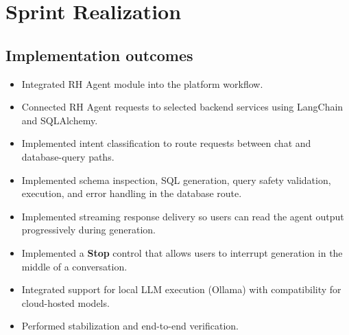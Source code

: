                                                                                                 \Needspace{0.28\textheight}
                                                                                                \section{Sprint Realization}
                                                                                                \subsection{Implementation outcomes}
                                                                                                \begin{itemize}[noitemsep]
                                                                                                    \item Integrated RH Agent module into the platform workflow.
                                                                                                        \item Connected RH Agent requests to selected backend services using LangChain and SQLAlchemy.
                                                                                                            \item Implemented intent classification to route requests between chat and database-query paths.
                                                                                                                \item Implemented schema inspection, SQL generation, query safety validation, execution, and error handling in the database route.
                                                                                                                    \item Implemented streaming response delivery so users can read the agent output progressively during generation.
                                                                                                                        \item Implemented a \textbf{Stop} control that allows users to interrupt generation in the middle of a conversation.
                                                                                                                            \item Integrated support for local LLM execution (Ollama) with compatibility for cloud-hosted models.
                                                                                                                                \item Performed stabilization and end-to-end verification.
                                                                                                                                \end{itemize}

